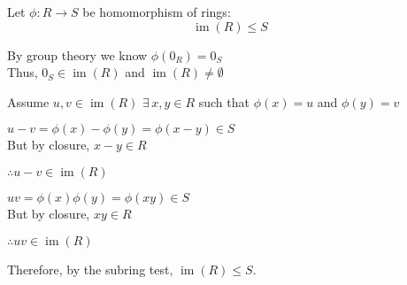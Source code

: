 \documentclass[letterpaper,12pt,fleqn]{article}
\DeclareMathOperator{\im}{im}
\begin{document}
\begin{theorem}
  Let $\phi:R\to S$ be homomorphism of rings:
  \[\im(R)\le S\]
\end{theorem}
\newpage
\begin{theproof}
  By group theory we know $\phi(0_R)=0_S$ \\
  Thus, $0_S\in\im(R)$ and $\im(R)\ne\emptyset$

  Assume $u,v\in\im(R)$
  $\exists\,x,y\in R$ such that $\phi(x)=u$ and $\phi(y)=v$

  $u-v=\phi(x)-\phi(y)=\phi(x-y)\in S$ \\
  But by closure, $x-y\in R$

  $\therefore u-v\in\im(R)$

  $uv=\phi(x)\phi(y)=\phi(xy)\in S$ \\
  But by closure, $xy\in R$

  $\therefore uv\in\im(R)$

  Therefore, by the subring test, $\im(R)\le S$.
\end{theproof}
\end{document}
